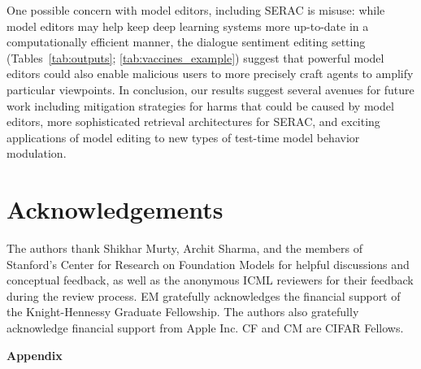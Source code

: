 \documentclass{article}
\newcommand{\name}{SERAC}
\begin{document}
One possible concern with model editors, including {\name} is misuse: while model editors may help keep deep learning systems more up-to-date in a computationally efficient manner, the dialogue sentiment editing setting (Tables~\ref{tab:outputs}; \ref{tab:vaccines_example}) suggest that powerful model editors could also enable malicious users to more precisely craft agents to amplify particular viewpoints. In conclusion, our results suggest several avenues for future work including mitigation strategies for harms that could be caused by model editors, more sophisticated retrieval architectures for {\name},  and exciting applications of model editing to new types of test-time model behavior modulation.


\section{Acknowledgements}

The authors thank Shikhar Murty, Archit Sharma, and the members of Stanford's Center for Research on Foundation Models for helpful discussions and conceptual feedback, as well as the anonymous ICML reviewers for their feedback during the review process. EM gratefully acknowledges the financial support of the  Knight-Hennessy Graduate Fellowship. The authors also gratefully acknowledge financial support from Apple Inc. CF and CM are CIFAR Fellows.

\clearpage



\clearpage


\appendix

{\LARGE \textbf{Appendix}}

\end{document}
